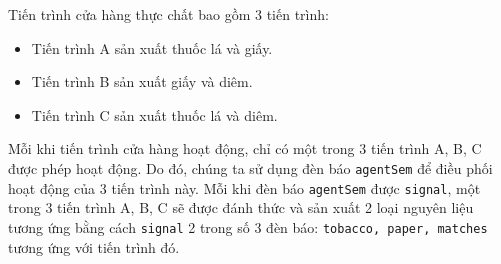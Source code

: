 \noindent Tiến trình cửa hàng thực chất bao gồm 3 tiến trình:
\begin{itemize}
    \item Tiến trình A sản xuất thuốc lá và giấy.
    \item Tiến trình B sản xuất giấy và diêm.
    \item Tiến trình C sản xuất thuốc lá và diêm.
\end{itemize}
Mỗi khi tiến trình cửa hàng hoạt động, chỉ có một trong 3 tiến trình A, B, C được phép hoạt động. Do đó, chúng ta sử dụng đèn báo {\tt agentSem} để điều phối hoạt động của 3 tiến trình này. Mỗi khi đèn báo {\tt agentSem} được {\tt signal}, một trong 3 tiến trình A, B, C sẽ được đánh thức và sản xuất 2 loại nguyên liệu tương ứng bằng cách {\tt signal} 2 trong số 3 đèn báo: {\tt tobacco, paper, matches} tương ứng với tiến trình đó.\\[10pt]
